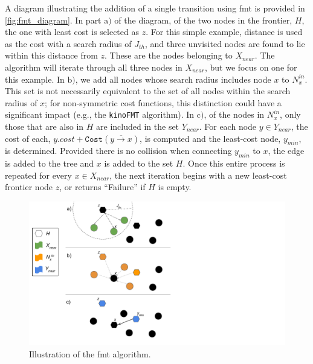 A diagram illustrating the addition of a single transition using \gls{fmt} is provided in \autoref{fig:fmt_diagram}. In part $\text{a)}$ of the diagram, of the two nodes in the frontier, $H$, the one with least cost is selected as $z$. For this simple example, distance is used as the cost with a search radius of $J_{th}$, and three unvisited nodes are found to lie within this distance from $z$. These are the nodes belonging to $X_{near}$. The algorithm will iterate through all three nodes in $X_{near}$, but we focus on one for this example. In $\text{b)}$, we add all nodes whose search radius includes node $x$ to $N_x^{in}$. This set is not necessarily equivalent to the set of all nodes within the search radius of $x$; for non-symmetric cost functions, this distinction could have a significant impact (e.g., the \texttt{kinoFMT} algorithm). In $\text{c)}$, of the nodes in $N_x^{in}$, only those that are also in $H$ are included in the set $Y_{near}$. For each node $y \in Y_{near}$, the cost of each, $y.cost + \texttt{Cost}(\overline{y \to x})$, is computed and the least-cost node, $y_{min}$, is determined. Provided there is no collision when connecting $y_{min}$ to $x$, the edge is added to the tree and $x$ is added to the set $H$. Once this entire process is repeated for every $x \in X_{near}$, the next iteration begins with a new least-cost frontier node $z$, or returns ``Failure'' if $H$ is empty.

\begin{figure}[!ht]
    \vspace*{4mm}
    \hspace*{8mm}
    \centering
    \includegraphics[scale=0.89]{./figures/fmt_diagram}
    \caption[FMT* Diagram]{
        Illustration of the \gls{fmt} algorithm.
    }
\label{fig:fmt_diagram}
\end{figure}
